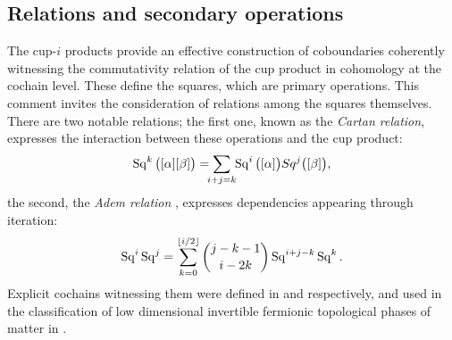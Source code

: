 \subsection{Relations and secondary operations}

The cup-$i$ products provide an effective construction of coboundaries coherently witnessing the commutativity relation of the cup product in cohomology at the cochain level.
These define the squares, which are primary operations.
This comment invites the consideration of relations among the squares themselves.
There are two notable relations;
the first one, known as the \textit{Cartan relation}, expresses the interaction between these operations and the cup product:
\begin{equation*}
	\Sq^k \big( [\alpha] [\beta] \big) =
	\sum_{\mathclap{i+j=k}} \, \Sq^i\big([\alpha]\big) Sq^j\big([\beta]\big),
\end{equation*}
the second, the \textit{Adem relation} \cite{adem1952iteration}, expresses dependencies appearing through iteration:
\begin{equation*}
	\operatorname{Sq}^i \operatorname{Sq}^j =
	\sum_{k=0}^{\lfloor i/2 \rfloor} \binom{j-k-1}{i-2k} \operatorname{Sq}^{i+j-k} \operatorname{Sq}^k.
\end{equation*}
Explicit cochains witnessing them were defined in \cite{medina2020cartan} and \cite{medina2021adem} respectively, and used in the classification of low dimensional invertible fermionic topological phases of matter in \cite{kapustin2017fermionic, barkeshli2021classification}.


